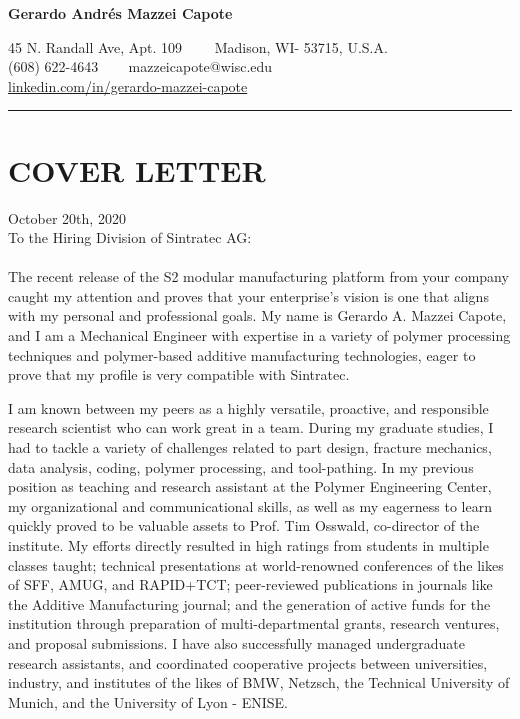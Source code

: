 \documentclass[12pt,letterpaper]{article}
\begin{document}
\begin{center}
	{\LARGE \textbf{Gerardo Andrés Mazzei Capote}}

	45 N. Randall Ave, Apt. 109\ \ \textbullet
	\ \ Madison, WI- 53715, U.S.A.
	\\
	(608) 622-4643 \ \textbullet
	\ \ mazzeicapote@wisc.edu\\
	\href{https://www.linkedin.com/in/gerardo-mazzei-capote}{linkedin.com/in/gerardo-mazzei-capote}
	
\end{center}
\vspace{-0.5em}
\hrule
\vspace{0.4em}
\vspace{-1em}

\section*{COVER LETTER}
\vspace{0.4em}
October 20th, 2020
\\
To the Hiring Division of Sintratec AG:
\\
\\
The recent release of the S2 modular manufacturing platform from your company caught my attention and proves that your enterprise's vision is one that aligns with my personal and professional goals. My name is Gerardo A. Mazzei Capote, and I am a Mechanical Engineer with expertise in a variety of polymer processing techniques and polymer-based additive manufacturing technologies, eager to prove that my profile is very compatible with Sintratec.

I am known between my peers as a highly versatile, proactive, and responsible research scientist who can work great in a team. During my graduate studies, I had to tackle a variety of challenges related to part design, fracture mechanics, data analysis, coding, polymer processing, and tool-pathing. In my previous position as teaching and research assistant at the Polymer Engineering Center, my organizational and communicational skills, as well as my eagerness to learn quickly proved to be valuable assets to Prof. Tim Osswald, co-director of the institute. My efforts directly resulted in high ratings from students in multiple classes taught; technical presentations at world-renowned conferences of the likes of SFF, AMUG, and RAPID+TCT; peer-reviewed publications in journals like the Additive Manufacturing journal; and the generation of active funds for the institution through preparation of multi-departmental grants, research ventures, and proposal submissions. I have also successfully managed undergraduate research assistants, and coordinated cooperative projects between universities, industry, and institutes of the likes of BMW, Netzsch, the Technical University of Munich, and the University of Lyon - ENISE. 
\end{document}
